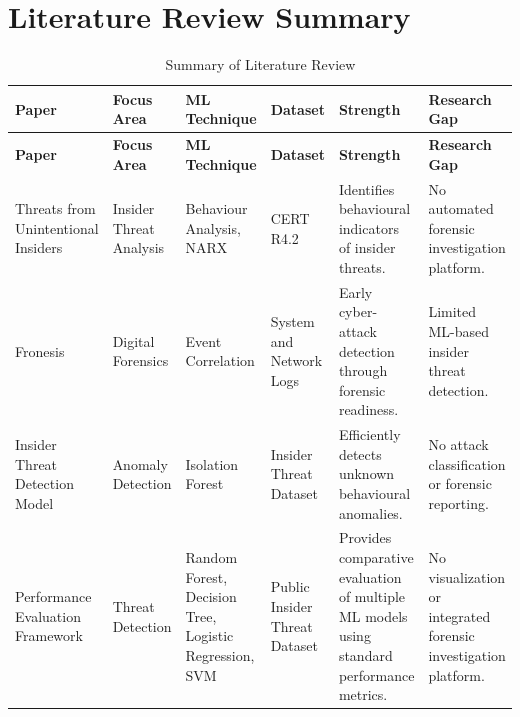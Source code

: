 \section{Literature Review Summary}
\begingroup
\scriptsize
\setlength{\tabcolsep}{2pt}
\renewcommand{\arraystretch}{1.15}
\begin{longtable}{|p{}|p{}|p{}|p{}|p{}|p{}|}
\caption{Summary of Literature Review}\label{tab:literature-review-summary}\\
\hline
\textbf{Paper} & \textbf{Focus Area} & \textbf{ML Technique} & \textbf{Dataset} & \textbf{Strength} & \textbf{Research Gap}\\
\hline
\endfirsthead
\hline
\textbf{Paper} & \textbf{Focus Area} & \textbf{ML Technique} & \textbf{Dataset} & \textbf{Strength} & \textbf{Research Gap}\\
\hline
\endhead
Threats from Unintentional Insiders & Insider Threat Analysis & Behaviour Analysis, NARX & CERT R4.2 & Identifies behavioural indicators of insider threats. & No automated forensic investigation platform.\\
\hline
Fronesis & Digital Forensics & Event Correlation & System and Network Logs & Early cyber-attack detection through forensic readiness. & Limited ML-based insider threat detection.\\
\hline
Insider Threat Detection Model & Anomaly Detection & Isolation Forest & Insider Threat Dataset & Efficiently detects unknown behavioural anomalies. & No attack classification or forensic reporting.\\
\hline
Performance Evaluation Framework & Threat Detection & Random Forest, Decision Tree, Logistic Regression, SVM & Public Insider Threat Dataset & Provides comparative evaluation of multiple ML models using standard performance metrics. & No visualization or integrated forensic investigation platform.\\
\hline
\end{longtable}
\endgroup
